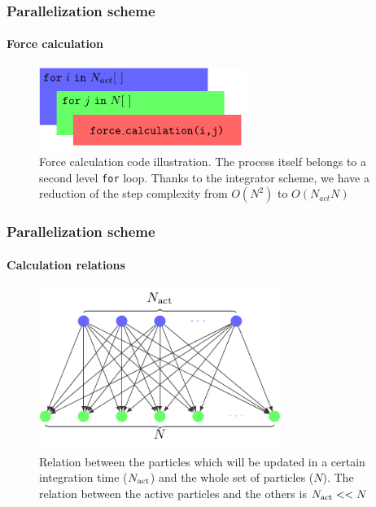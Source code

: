 \begin{frame}
    \frametitle{Parallelization scheme}
    \framesubtitle{Force calculation}

    \begin{center}
    \begin{figure}[H]
        \centering
        \includegraphics[width=0.6\textwidth]{img/force_calculation.pdf}
        \caption{Force calculation code illustration.
                 The process itself belongs to a second level \texttt{for} loop.
                 Thanks to the integrator scheme, we have a reduction
                 of the step complexity from $O(N^{2})$ to $O(N_{act} N)$}
        \label{fig:force_code_diagram}
    \end{figure}
    \end{center}

\end{frame}

\begin{frame}
    \frametitle{Parallelization scheme}
    \framesubtitle{Calculation relations}

    \begin{center}
    \begin{figure}[H]
        \centering
        \includegraphics[width=0.7\textwidth]{img/forces_nact_n.pdf}
        \caption{Relation between the particles which will be updated in a certain
                 integration time ($N_{\rm act}$) and the whole set of particles ($N$).
                 The relation between the active particles and the others is
                 $N_{\rm act} << N$}
        \label{fig:nact_n}
    \end{figure}
    \end{center}

\end{frame}


